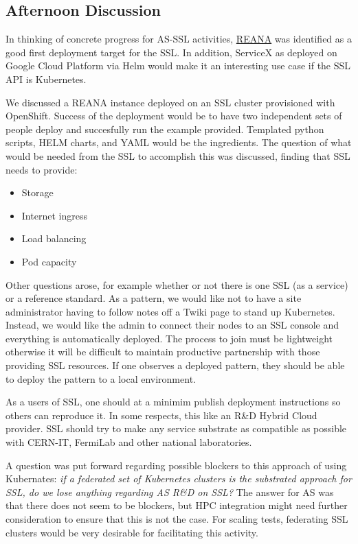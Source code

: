 \documentclass[11pt,letterpaper,fleqn]{article}
\begin{document}
\subsection{Afternoon Discussion}
\vspace{0.2cm}
In thinking of concrete progress for AS-SSL activities, \href{http://www.reanahub.io/}{REANA} was identified as a good first deployment target for the SSL. In addition, ServiceX as deployed on Google Cloud Platform via Helm would make it an interesting use case if the SSL API is Kubernetes.

We discussed a {\sf REANA} instance deployed on an SSL cluster provisioned with OpenShift. Success of the deployment would be to have two independent sets of people deploy and succesfully run the example provided. Templated python scripts, HELM charts, and YAML would be the ingredients. The question of what would be needed from the SSL to accomplish this was discussed, finding that SSL needs to provide:
\begin{itemize}
  \item Storage
  \item Internet ingress
  \item Load balancing
  \item Pod capacity
\end{itemize}

Other questions arose, for example whether or not there is one SSL (as a service) or a reference standard. As a pattern, we would like not to have a site administrator having to follow notes off a Twiki page to stand up Kubernetes. Instead, we would like the admin to connect their nodes to an SSL console and everything is automatically deployed. The process to join must be lightweight otherwise it will be difficult to maintain productive partnership with those providing SSL resources. If one observes a deployed pattern, they should be able to deploy the pattern to a local environment.

As a users of SSL, one should at a minimim publish deployment instructions so others can reproduce it. In some respects, this like an R\&D Hybrid Cloud provider. SSL should try to make any service substrate as compatible as possible with CERN-IT, FermiLab and other national laboratories.

A question was put forward regarding possible blockers to this approach of using Kubernates: \textit{if a federated set of Kubernetes clusters is the substrated approach for SSL, do we lose anything regarding AS R\&D on SSL?} The answer for AS was that there does not seem to be blockers, but HPC integration might need further consideration to ensure that this is not the case. For scaling tests, federating SSL clusters would be very desirable for facilitating this activity.
\end{document}
